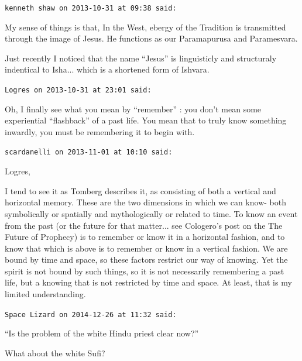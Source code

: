 \begin{footnotesize}
\begin{sffamily}
\texttt{kenneth shaw on 2013-10-31 at 09:38 said:}

My sense of things is that, In the West, ebergy of the Tradition is transmitted through the image of Jesus. He functions as our Paramapurusa and Paramesvara.

Just recently I noticed that the name ``Jesus'' is linguisticly and structuraly indentical to Isha... which is a shortened form of Ishvara.

\hfill

\texttt{Logres on 2013-10-31 at 23:01 said:}

Oh, I finally see what you mean by ``remember'' : you don't mean some experiential ``flashback'' of a past life. You mean that to truly know something inwardly, you must be remembering it to begin with.

\hfill

\texttt{scardanelli on 2013-11-01 at 10:10 said:}

Logres,

I tend to see it as Tomberg describes it, as consisting of both a vertical and horizontal memory. These are the two dimensions in which we can know- both symbolically or spatially and mythologically or related to time. To know an event from the past (or the future for that matter... see Cologero's post on the The Future of Prophecy) is to remember or know it in a horizontal fashion, and to know that which is above is to remember or know in a vertical fashion. We are bound by time and space, so these factors restrict our way of knowing. Yet the spirit is not bound by such things, so it is not necessarily remembering a past life, but a knowing that is not restricted by time and space. At least, that is my limited understanding.

\hfill

\texttt{Space Lizard on 2014-12-26 at 11:32 said:}

``Is the problem of the white Hindu priest clear now?''

What about the white Sufi?


\hfill

\end{sffamily}
\end{footnotesize}

